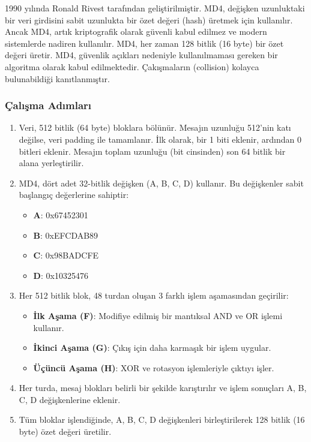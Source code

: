 1990 yılında Ronald Rivest tarafından geliştirilmiştir. MD4, değişken uzunluktaki bir veri girdisini sabit uzunlukta bir özet değeri (hash) üretmek için kullanılır. Ancak MD4, artık kriptografik olarak güvenli kabul edilmez ve modern sistemlerde nadiren kullanılır. MD4, her zaman 128 bitlik (16 byte) bir özet değeri üretir. MD4, güvenlik açıkları nedeniyle kullanılmaması gereken bir algoritma olarak kabul edilmektedir. Çakışmaların (collision) kolayca bulunabildiği kanıtlanmıştır.

\subsubsection{Çalışma Adımları}

\begin{enumerate}
    \item Veri, 512 bitlik (64 byte) bloklara bölünür. Mesajın uzunluğu 512'nin katı değilse, veri padding ile tamamlanır. İlk olarak, bir 1 biti eklenir, ardından 0 bitleri eklenir. Mesajın toplam uzunluğu (bit cinsinden) son 64 bitlik bir alana yerleştirilir.
    \item MD4, dört adet 32-bitlik değişken (A, B, C, D) kullanır. Bu değişkenler sabit başlangıç değerlerine sahiptir:
    \begin{itemize}
        \item \textbf{A}: 0x67452301
        \item \textbf{B}: 0xEFCDAB89
        \item \textbf{C}: 0x98BADCFE
        \item \textbf{D}: 0x10325476
    \end{itemize}
    \item Her 512 bitlik blok, 48 turdan oluşan 3 farklı işlem aşamasından geçirilir:
    \begin{itemize}
        \item \textbf{İlk Aşama (F)}: Modifiye edilmiş bir mantıksal AND ve OR işlemi kullanır.
        \item \textbf{İkinci Aşama (G)}: Çıkış için daha karmaşık bir işlem uygular.
        \item \textbf{Üçüncü Aşama (H)}: XOR ve rotasyon işlemleriyle çıktıyı işler.
    \end{itemize}
    \item Her turda, mesaj blokları belirli bir şekilde karıştırılır ve işlem sonuçları A, B, C, D değişkenlerine eklenir.
    \item Tüm bloklar işlendiğinde, A, B, C, D değişkenleri birleştirilerek 128 bitlik (16 byte) özet değeri üretilir.
\end{enumerate}

